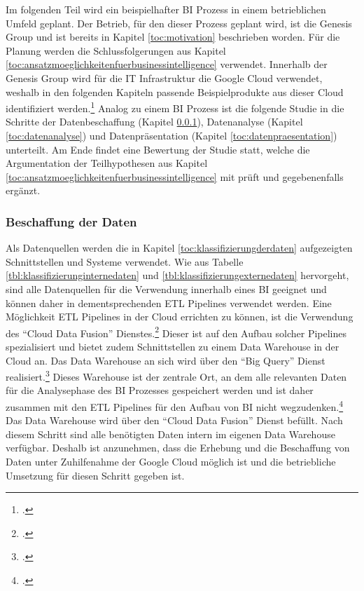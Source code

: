 Im folgenden Teil wird ein beispielhafter \ac{BI} Prozess in einem betrieblichen Umfeld geplant. Der Betrieb, für den dieser Prozess
geplant wird, ist die Genesis Group und ist bereits in Kapitel \ref{toc:motivation} beschrieben worden. Für die Planung werden
die Schlussfolgerungen aus Kapitel \ref{toc:ansatzmoeglichkeitenfuerbusinessintelligence} verwendet. Innerhalb der Genesis Group
wird für die IT Infrastruktur die Google Cloud verwendet, weshalb in den folgenden Kapiteln passende Beispielprodukte aus dieser Cloud
identifiziert werden.\footcite[Vgl.][]{googlecloud2021dw} Analog zu einem \ac{BI} Prozess ist die folgende Studie in die Schritte der Datenbeschaffung
(Kapitel \ref{toc:datenhaltung}), Datenanalyse (Kapitel \ref{toc:datenanalyse}) und Datenpräsentation (Kapitel \ref{toc:datenpraesentation})
unterteilt. Am Ende findet eine Bewertung der Studie statt, welche die Argumentation der Teilhypothesen aus Kapitel
\ref{toc:ansatzmoeglichkeitenfuerbusinessintelligence} mit prüft und gegebenenfalls ergänzt.

\subsubsection{Beschaffung der Daten} \label{toc:datenhaltung}

Als Datenquellen werden die in Kapitel \ref{toc:klassifizierungderdaten} aufgezeigten Schnittstellen und Systeme verwendet.
Wie aus Tabelle \ref{tbl:klassifizierunginternedaten} und \ref{tbl:klassifizierungexternedaten} hervorgeht, sind alle Datenquellen für die
Verwendung innerhalb eines \ac{BI} geeignet und können daher in dementsprechenden \ac{ETL} Pipelines verwendet werden.
Eine Möglichkeit \ac{ETL} Pipelines in der Cloud errichten zu können, ist die Verwendung des "`Cloud Data Fusion"'
Dienstes.\footcite[Vgl.][]{googlecloud2021dw} Dieser ist auf den Aufbau solcher Pipelines spezialisiert und bietet zudem Schnittstellen
zu einem Data Warehouse in der Cloud an. Das Data Warehouse an sich wird über den "`Big Query"' Dienst realisiert.\footcite[Vgl.][]{googlecloud2021dw}
Dieses Warehouse ist der zentrale Ort, an dem alle relevanten Daten für die Analysephase des \ac{BI} Prozesses gespeichert werden und
ist daher zusammen mit den \ac{ETL} Pipelines für den Aufbau von \ac{BI} nicht wegzudenken.\footcite[Vgl.][S. 105ff]{loshin2012business}
Das Data Warehouse wird über den "`Cloud Data Fusion"' Dienst befüllt. Nach diesem Schritt sind alle benötigten Daten intern
im eigenen Data Warehouse verfügbar. Deshalb ist anzunehmen,
dass die Erhebung und die Beschaffung von Daten unter Zuhilfenahme der Google Cloud möglich ist und die betriebliche
Umsetzung für diesen Schritt gegeben ist.


